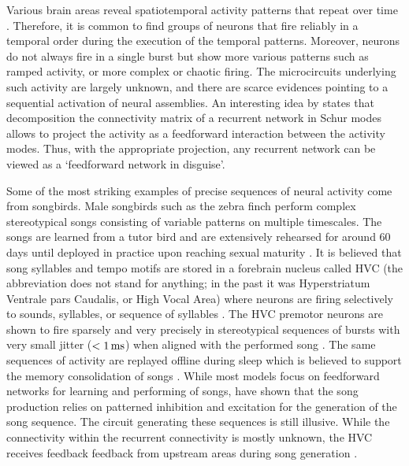     Various brain areas reveal spatiotemporal activity patterns that repeat
    over time \cite[e.g.,][]{Wilson1994, Kenet2003, Berkes2011}. Therefore, it
    is common to find groups of neurons that fire reliably in a temporal order
    during the execution of the temporal patterns. Moreover, neurons do not
    always fire in a single burst but show more various patterns such as ramped
    activity, or more complex or chaotic firing. The microcircuits
    underlying such activity are largely unknown, and there are scarce
    evidences pointing to a sequential activation of neural assemblies. An
    interesting idea by \cite{Goldman2009} states that decomposition the
    connectivity matrix of a recurrent network in Schur modes allows to project
    the activity as a feedforward interaction between the activity modes. Thus,
    with the appropriate projection, any recurrent network can be viewed as a
    `feedforward network in disguise'.

    Some of the most striking examples of precise sequences of neural activity
    come from songbirds. Male songbirds such as the zebra finch perform complex
    stereotypical songs consisting of variable patterns on multiple timescales.
    The songs are learned from a tutor bird and are extensively rehearsed for
    around 60 days until deployed in practice upon reaching sexual maturity
    \citep{George1995, Doupe2004}. It is believed that song syllables and tempo
    motifs are stored in a forebrain nucleus called HVC (the abbreviation does
    not stand for anything; in the past it was Hyperstriatum Ventrale pars
    Caudalis, or High Vocal Area) where neurons are firing selectively to
    sounds, syllables, or sequence of syllables \citep{Yu1996}. The HVC premotor
    neurons are shown to fire sparsely and very precisely in stereotypical
    sequences of bursts with very small jitter ($<1\,\rm ms$) when aligned with
    the performed song \citep{Hahnloser2002}. The same sequences of activity
    are replayed offline during sleep which is believed to support the memory
    consolidation of songs \citep{Dave2000}. While most models focus on
    feedforward networks for learning and performing of songs,
    \cite{Kosche2015} have shown that the song production relies on patterned
    inhibition and excitation for the generation of the song sequence. The
    circuit generating these sequences is still illusive.  While the
    connectivity within the recurrent connectivity is mostly unknown, the HVC
    receives feedback feedback from upstream areas during song generation
    \citep{Hamaguchi2012}.

